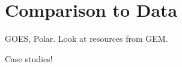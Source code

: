
\chapter{Comparison to Data}
\label{data_chapter}

GOES, Polar. Look at resources from GEM. 


Case studies! 



